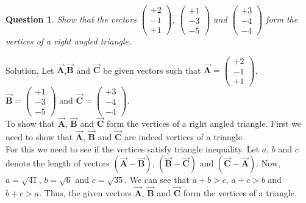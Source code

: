 \documentclass{article}
\newtheorem{question}[theorem]{Question}
\newcommand{\vect}[1]{\boldsymbol{\vec{#1}}}
\begin{document}
\begin{question}
	Show that the vectors $\begin{pmatrix} 
		 +2\\-1\\+1 
	\end{pmatrix}$, $\begin{pmatrix} 
	 +1\\-3\\-5 
\end{pmatrix}$ and $\begin{pmatrix} 
+3\\-4\\-4 
\end{pmatrix}$ form the vertices of a right angled triangle.
\end{question}
Solution. Let $\vect{A}$,$\vect{B}$  and $\vect{C}$ be given vectors such that $\vect{A} =\begin{pmatrix} 
	+2\\-1\\+1 
\end{pmatrix}$,\\     
$\vect{B}= \begin{pmatrix} 
+1\\-3\\-5 
\end{pmatrix}$ and $\vect{C}= \begin{pmatrix} 
+3\\-4\\-4 
\end{pmatrix}$.\\
To show that $\vect{A}$, $\vect{B}$ and $\vect{C}$ form the vertices of a right angled triangle. First we need to show that $\vect{A}$, $\vect{B}$ and $\vect{C}$ are indeed vertices of a triangle.\\
For this we need to see if the vertices satisfy triangle inequality. Let $a$, $b$ and $c$ denote the length of vectors $(\vect{A}- \vect{B})$, $(\vect{B}-\vect{C})$ and $(\vect{C}- \vect{A})$. Now,\\
$a=\sqrt{41}$, $b=\sqrt{6}$ and $c=\sqrt{35}$. We can see that  $a+b>c$, 
$a+c>b$ and $b+c >a$. Thus, the given vectors $\vect{A}$, $\vect{B}$ and $\vect{C}$ form the vertices of a triangle.\\
\end{document}
